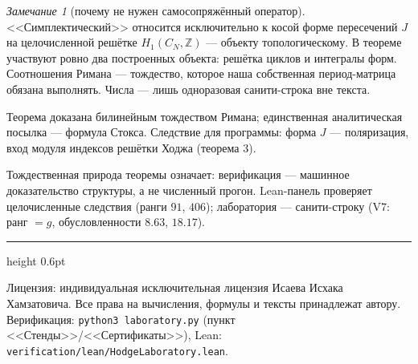 \documentclass[11pt,a4paper]{article}
\theoremstyle{plain}
\theoremstyle{definition}
\theoremstyle{remark}
\newtheorem{remark}[theorem]{Замечание}
\newcommand{\ZZ}{\mathbb{Z}}
\begin{document}
\begin{remark}[почему не нужен самосопряжённый оператор]
<<Симплектический>> относится исключительно к косой форме
пересечений $J$ на целочисленной решётке $H_1(C_N,\ZZ)$ ---
объекту топологическому. В теореме участвуют ровно два построенных
объекта: решётка циклов и интегралы форм. Соотношения Римана ---
тождество, которое наша собственная период-матрица обязана
выполнять. Числа --- лишь одноразовая санити-строка вне текста.
\end{remark}

\begin{statusbox}[итог]
Теорема доказана билинейным тождеством Римана; единственная
аналитическая посылка --- формула Стокса. Следствие для программы:
форма $J$ --- поляризация, вход модуля индексов решётки Ходжа
(теорема 3).
\end{statusbox}

\begin{verifybox}
Тождественная природа теоремы означает: верификация ---
машинное доказательство структуры, а не численный прогон. Lean-панель
проверяет целочисленные следствия (ранги $91$, $406$); лаборатория
--- санити-строку (V7: ранг $=g$, обусловленности $8.63$, $18.17$).
\end{verifybox}

\vfill
{\color{linkblue}\hrule height 0.6pt}
\vspace{0.5em}
{\small\color{gray}
Лицензия: индивидуальная исключительная лицензия Исаева Исхака Хамзатовича.
Все права на вычисления, формулы и тексты принадлежат автору.
Верификация: \texttt{python3 laboratory.py} (пункт <<Стенды>>/<<Сертификаты>>),
Lean: \texttt{verification/lean/HodgeLaboratory.lean}.
}
\end{document}
